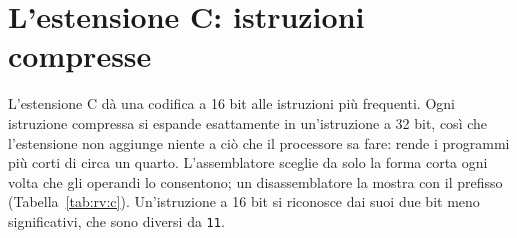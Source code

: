 \section{L'estensione C: istruzioni compresse}

L'estensione C dà una codifica a 16 bit alle istruzioni più frequenti. Ogni
istruzione compressa si espande esattamente in un'istruzione a 32 bit, così
che l'estensione non aggiunge niente a ciò che il processore sa fare: rende i
programmi più corti di circa un quarto. L'assemblatore sceglie da solo la
forma corta ogni volta che gli operandi lo consentono; un disassemblatore la
mostra con il prefisso  (Tabella~\ref{tab:rv:c}). Un'istruzione a 16
bit si riconosce dai suoi due bit meno significativi, che sono diversi da
\texttt{11}.

